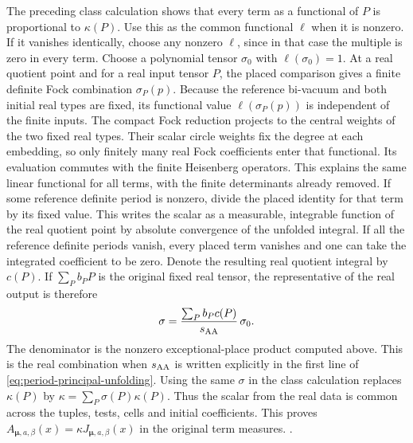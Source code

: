 The preceding class calculation shows that every term
as a functional of \(P\) is proportional to \(\kappa(P)\).
Use this as the common functional \(\ell\) when it is
nonzero. If it vanishes identically, choose any nonzero
\(\ell\), since in that case the multiple is zero in every
term. Choose a polynomial tensor \(\sigma_0\) with
\(\ell(\sigma_0)=1\). At a real
quotient point and for a real input tensor \(P\), the
placed comparison gives a finite definite Fock combination
\(\sigma_{P}(p)\). Because the reference bi-vacuum and both
initial real types are fixed, its functional value
\(\ell(\sigma_P(p))\) is independent of the finite inputs.
The compact Fock reduction projects to the central weights
of the two fixed real types. Their scalar circle weights fix
the degree at each embedding, so only finitely many real
Fock coefficients enter that functional. Its evaluation
commutes with the finite Heisenberg operators. This explains
the same linear functional for all terms, with the
finite determinants already removed. If some reference
definite period is nonzero, divide the placed identity
for that term by its fixed value. This writes the scalar
as a measurable, integrable function of the real quotient
point by absolute convergence of the unfolded integral.
If all the reference definite periods vanish, every
placed term vanishes and one can take the integrated
coefficient to be zero. Denote the resulting real
quotient integral by \(c(P)\).
If \(\sum_P b_P P\) is the original fixed real tensor,
the representative of the real output is therefore
\[
 \sigma=\frac{\sum_P b_P c(P)}{s_{\rm AA}}\,\sigma_0.
\]
The denominator is the nonzero exceptional-place product
computed above. This is the real combination when \(s_{\rm AA}\) is written explicitly in
the first line of \eqref{eq:period-principal-unfolding}.
Using the same \(\sigma\) in the class calculation replaces
\(\kappa(P)\) by \(\kappa=\sum_P \sigma(P)\kappa(P)\).
Thus the scalar from the real data is common across the tuples,
tests, cells and initial coefficients. This proves
\(A_{\boldsymbol\mu,a,\beta}(x)=\kappa
J_{\boldsymbol\mu,a,\beta}(x)\) in the original term
measures.
.

